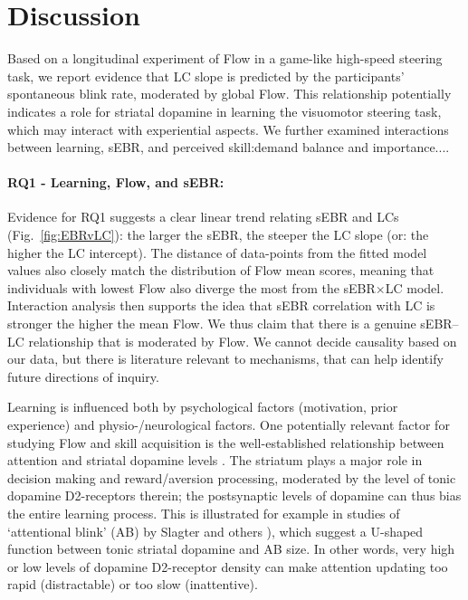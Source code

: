 \documentclass[10pt,letterpaper,floatsintext]{article}
\begin{document}
\section{Discussion}
Based on a longitudinal experiment of Flow in a game-like high-speed steering task, we report evidence that LC slope is predicted by the participants' spontaneous blink rate, moderated by global Flow. This relationship potentially indicates a role for striatal dopamine in learning the visuomotor steering task, which may interact with experiential aspects. We further examined interactions between learning, sEBR, and perceived skill:demand balance and importance....%


\paragraph{RQ1 - Learning, Flow, and sEBR:}
Evidence for RQ1 suggests a clear linear trend relating sEBR and LCs (Fig.~\ref{fig:EBRvLC}): the larger the sEBR, the steeper the LC slope (or: the higher the LC intercept). The distance of data-points from the fitted model values also closely match the distribution of Flow mean scores, meaning that individuals with lowest Flow also diverge the most from the sEBR$\times$LC model. Interaction analysis then supports the idea that sEBR correlation with LC is stronger the higher the mean Flow. We thus claim that there is a genuine sEBR--LC relationship that is moderated by Flow. We cannot decide causality based on our data, but there is literature relevant to mechanisms, that can help identify future directions of inquiry.

Learning is influenced both by psychological factors (motivation, prior experience) and physio-/neurological factors. One potentially relevant factor for studying Flow and skill acquisition is the well-established relationship between attention and striatal dopamine levels \cite{Dreisbach2005}. The striatum plays a major role in decision making and reward/aversion processing, moderated by the level of tonic dopamine D2-receptors therein; the postsynaptic levels of dopamine can thus bias the entire learning process. This is illustrated for example in studies of `attentional blink' (AB) by Slagter and others \cite{Slagter2012,COLZATO2008}), which suggest a U-shaped function between tonic striatal dopamine and AB size. In other words, very high or low levels of dopamine D2-receptor density can make attention updating too rapid (distractable) or too slow (inattentive).
\end{document}
